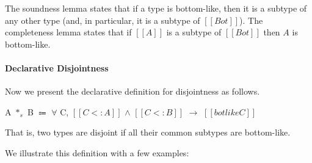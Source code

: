 \noindent The soundness lemma states that if a type is bottom-like, then it is
a subtype of any other type (and, in particular, it is a subtype of $[[Bot]]$).
The completeness lemma states that if $[[A]]$ is a subtype of $[[Bot]]$ then $A$
is bottom-like.

\begin{comment}
\begin{proof}
  By induction on type $[[A]]$.
  \begin{itemize}
    \item Cases $[[Top]]$, $[[Bot]]$, $[[Int]]$ and $[[A -> B]]$ are trivial to prove.
    \item Case $[[A \/ B]]$ requires \Cref{lemma:union:sub-or}.
  \end{itemize}
\end{proof}
\end{comment}

\paragraph{Declarative Disjointness}
Now we present
the declarative definition for disjointness as follows.

\begin{definition}
  A $*_s$ B $\Coloneqq$ $\forall$ C, $[[C <: A]]$ $\wedge$ $[[C <: B]]$ $\rightarrow$ $[[botlike C]]$
\label{def:union:disj}
\end{definition}

\noindent That is, two types are disjoint if all their common subtypes are bottom-like.
\begin{comment}
With this definition we have that different primitive types are disjoint. For example
$[[Int]] * [[Bool]]$ since the only common subtypes of $[[Int]]$ and $[[Bool]]$
are bottom-like. A more interesting case is the disjointness of two function types.
It turns out that function types are never disjoint, since we can always find
a common subtype for any two function types. For example, if we have $[[Int -> Bool]]$
and $[[String -> Char]]$ then a common subtype that is not bottom-like is
$[[Top -> Bot]]$. Therefore, $[[Int -> Bool]]$ and $[[String -> Char]]$ are not
disjoint.

\noindent Reader may think at this point that $[[Bot]]$ type can simply be used in \Cref{def:union:disj}
instead of $[[botlike C]]$ in the conclusion. Answer to this question is
union type with $[[Bot]]$ as all primitive types is also a least subtype in \cal.
$[[botlike C]]$ also handles this case.
\end{comment}
We illustrate this definition with a few examples:

